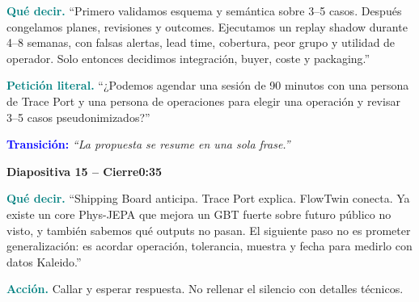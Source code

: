 \documentclass[11pt,a4paper]{article}
\newcommand{\slidehead}[3]{%
  \par\vspace{7pt}\noindent
  \colorbox{Ink}{\parbox{\dimexpr\linewidth-2\fboxsep\relax}{%
    \color{white}\textbf{Diapositiva #1 -- #2}\hfill\color{Teal!45}\textbf{#3}}}%
  \par\vspace{5pt}}
\newcommand{\cue}[1]{\textcolor{Teal}{\textbf{#1}}}
\newcommand{\transition}[1]{\textcolor{Blue}{\textbf{Transición:}} \emph{``#1''}}
\begin{document}
\cue{Qué decir.} ``Primero validamos esquema y semántica sobre 3--5 casos. Después
congelamos planes, revisiones y outcomes. Ejecutamos un replay shadow durante 4--8 semanas,
con falsas alertas, lead time, cobertura, peor grupo y utilidad de operador. Solo entonces
decidimos integración, buyer, coste y packaging.''

\cue{Petición literal.} ``¿Podemos agendar una sesión de 90 minutos con una persona de
Trace Port y una persona de operaciones para elegir una operación y revisar 3--5 casos
pseudonimizados?''

\transition{La propuesta se resume en una sola frase.}

\slidehead{15}{Cierre}{0:35}
\cue{Qué decir.} ``Shipping Board anticipa. Trace Port explica. FlowTwin conecta. Ya existe
un core Phys-JEPA que mejora un GBT fuerte sobre futuro público no visto, y también sabemos
qué outputs no pasan. El siguiente paso no es prometer generalización: es acordar operación,
tolerancia, muestra y fecha para medirlo con datos Kaleido.''

\cue{Acción.} Callar y esperar respuesta. No rellenar el silencio con detalles técnicos.

\clearpage
\end{document}
